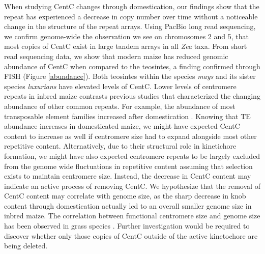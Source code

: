 When studying CentC changes through domestication, our findings show that the repeat has experienced a decrease in copy number over time without a noticeable change in the structure of the repeat arrays. Using PacBio long read sequencing, we confirm genome-wide the observation we see on chromosomes 2 and 5, that most copies of CentC exist in large tandem arrays in all \emph{Zea} taxa.    From short read sequencing data, we show that modern maize has reduced genomic abundance of CentC when compared to the teosintes, a finding confirmed through FISH (Figure \ref{abundance}).  Both teosintes within the species \emph{mays} and its sister species \emph{luxurians} have elevated levels of CentC.  Lower levels of centromere repeats in inbred maize contrasts previous studies that characterized the changing abundance of other common repeats.  For example, the abundance of most transposable element families increased after domestication \citep{Chia2012}.  Knowing that TE abundance increases in domesticated maize, we might have expected CentC content to increase as well if centromere size had to expand alongside most other repetitive content.  Alternatively, due to their structural role in kinetichore formation, we might have also expected centromere repeats to be largely excluded from the genome wide fluctuations in repetitive content assuming that selection exists to maintain centromere size.  Instead, the decrease in CentC content may indicate an active process of removing CentC.  We hypothesize that the removal of CentC content may correlate with genome size, as the sharp decrease in knob content through domestication actually led to an overall smaller genome size in inbred maize. The correlation between  functional  centromere size and genome size has been observed in grass species \citep{Zhang2012}.   Further investigation would be required to discover whether only those copies of CentC outside of the active kinetochore are being deleted.

